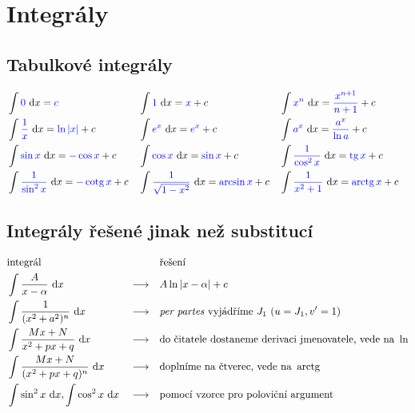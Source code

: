\section{Integrály}\label{appint}
\subsection*{Tabulkové integrály}
\begin{align*}
&\int \textcolor{blue}{0} \, \d x = \textcolor{blue}{c} & & \int \textcolor{blue}{1}\,  \d x = \textcolor{blue}{x}+c & & \int \textcolor{blue}{x^n} \, \d x = \textcolor{blue}{\frac{x^{n+1}}{n+1}}+c \\
&\int \textcolor{blue}{\frac{1}{x}} \, \d x = \textcolor{blue}{\ln |x|} + c & & \int \textcolor{blue}{e^x}\, \d x = \textcolor{blue}{e^x}+c & &  \int \textcolor{blue}{a^x} \, \d x = \textcolor{blue}{\frac{a^x}{\ln a}} + c \\
&\int \textcolor{blue}{\sin x} \, \d x = \textcolor{blue}{-\cos x} + c & & \int \textcolor{blue}{\cos x} \, \d x = \textcolor{blue}{\sin x} +c & &\int \textcolor{blue}{\frac{1}{\cos^2 x}}\, \d x = \textcolor{blue}{\tg x} + c \\
&\int \textcolor{blue}{\frac{1}{\sin^2 x}} \, \d x = \textcolor{blue}{-\cotg x}+c & & \int \textcolor{blue}{\frac{1}{\sqrt{1-x^2} }}\, \d x = \textcolor{blue}{\arcsin x} + c & &\int \textcolor{blue}{\frac{1}{x^2+1}}\, \d x = \textcolor{blue}{\arctg x} + c&
\end{align*}

\subsection*{Integrály řešené jinak než substitucí}
\begin{align*}
    &\textrm{integrál}                        & &                 & & \textrm{řešení} \\
    &\int \frac{A}{x-\alpha}\, \mathop{}\!\mathrm{d} x             & & \longrightarrow & & A\operatorname{ln}|x-\alpha|+c \\
    &\int \frac{1}{(x^2+a^2)^n}\, \mathop{}\!\mathrm{d} x          & & \longrightarrow & & \textit{per partes } \textrm{vyjádříme } J_1 \textrm{ ($u=J_1, v^\prime=1$)}\\
    &\int \frac{Mx+N}{x^2+px+q}\, \mathop{}\!\mathrm{d} x          & & \longrightarrow & & \textrm{do čitatele dostaneme derivaci jmenovatele, vede na } \operatorname{ln} \\
    &\int \frac{Mx+N}{(x^2+px+q)^n}\, \mathop{}\!\mathrm{d} x      & & \longrightarrow & & \textrm{doplníme na čtverec, vede na } \operatorname{arctg}  \\
    &\int \sin^2 x\, \mathop{}\!\mathrm{d} x, \int \cos^2 x \, \mathop{}\!\mathrm{d} x  & & \longrightarrow & & \textrm{pomocí vzorce pro poloviční argument}
\end{align*}

